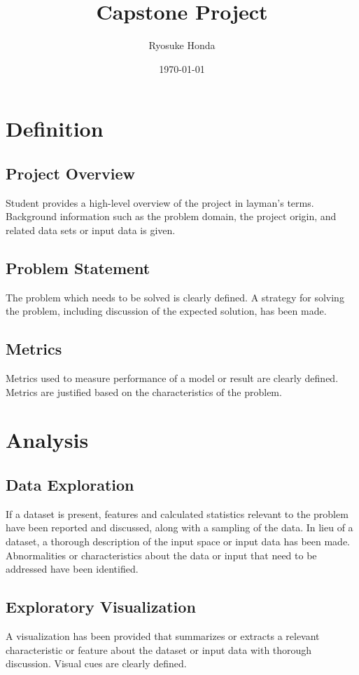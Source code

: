 \documentclass[a4paper,10pt,fleqn]{article}
\title{{\Huge Capstone Project}}%
\author{Ryosuke Honda}
\date{\today}
\begin{document}
\maketitle

\section{Definition}
\subsection{Project Overview}
Student provides a high-level overview of the project in layman’s terms. Background information such as the problem domain, the project origin, and related data sets or input data is given.


\subsection{Problem Statement}
The problem which needs to be solved is clearly defined. A strategy for solving the problem, including discussion of the expected solution, has been made.

\subsection{Metrics}
Metrics used to measure performance of a model or result are clearly defined. Metrics are justified based on the characteristics of the problem.


\section{Analysis}
\subsection{Data Exploration}
If a dataset is present, features and calculated statistics relevant to the problem have been reported and discussed, along with a sampling of the data. In lieu of a dataset, a thorough description of the input space or input data has been made. Abnormalities or characteristics about the data or input that need to be addressed have been identified.


\subsection{Exploratory Visualization}
A visualization has been provided that summarizes or extracts a relevant characteristic or feature about the dataset or input data with thorough discussion. Visual cues are clearly defined.
\end{document}
